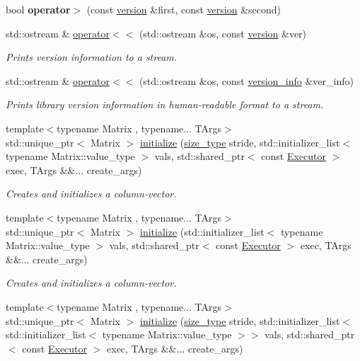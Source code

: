 \begin{DoxyCompactItemize}
bool {\bfseries operator$>$} (const \hyperlink{structgko_1_1version}{version} \&first, const \hyperlink{structgko_1_1version}{version} \&second)
\item 
std\+::ostream \& \hyperlink{namespacegko_ae0ef652f487afe43aebcf778038ff780}{operator$<$$<$} (std\+::ostream \&os, const \hyperlink{structgko_1_1version}{version} \&ver)
\begin{DoxyCompactList}\small\item\em Prints version information to a stream. \end{DoxyCompactList}\item 
std\+::ostream \& \hyperlink{namespacegko_ad9e3ba96a10fe47a03ceef39b45bd43c}{operator$<$$<$} (std\+::ostream \&os, const \hyperlink{classgko_1_1version__info}{version\+\_\+info} \&ver\+\_\+info)
\begin{DoxyCompactList}\small\item\em Prints library version information in human-\/readable format to a stream. \end{DoxyCompactList}\item 
{\footnotesize template$<$typename Matrix , typename... T\+Args$>$ }\\std\+::unique\+\_\+ptr$<$ Matrix $>$ \hyperlink{group__mat__formats_ga2f54bac1e95fb3ef03974fa9c9088491}{initialize} (\hyperlink{namespacegko_a6e5c95df0ae4e47aab2f604a22d98ee7}{size\+\_\+type} stride, std\+::initializer\+\_\+list$<$ typename Matrix\+::value\+\_\+type $>$ vals, std\+::shared\+\_\+ptr$<$ const \hyperlink{classgko_1_1Executor}{Executor} $>$ exec, T\+Args \&\&... create\+\_\+args)
\begin{DoxyCompactList}\small\item\em Creates and initializes a column-\/vector. \end{DoxyCompactList}\item 
{\footnotesize template$<$typename Matrix , typename... T\+Args$>$ }\\std\+::unique\+\_\+ptr$<$ Matrix $>$ \hyperlink{group__mat__formats_gaac5f7b4ff3b43dbc6918c687dd7d2d2e}{initialize} (std\+::initializer\+\_\+list$<$ typename Matrix\+::value\+\_\+type $>$ vals, std\+::shared\+\_\+ptr$<$ const \hyperlink{classgko_1_1Executor}{Executor} $>$ exec, T\+Args \&\&... create\+\_\+args)
\begin{DoxyCompactList}\small\item\em Creates and initializes a column-\/vector. \end{DoxyCompactList}\item 
{\footnotesize template$<$typename Matrix , typename... T\+Args$>$ }\\std\+::unique\+\_\+ptr$<$ Matrix $>$ \hyperlink{group__mat__formats_gaaf2520e5921e1bea00853c290f4fc28f}{initialize} (\hyperlink{namespacegko_a6e5c95df0ae4e47aab2f604a22d98ee7}{size\+\_\+type} stride, std\+::initializer\+\_\+list$<$ std\+::initializer\+\_\+list$<$ typename Matrix\+::value\+\_\+type $>$$>$ vals, std\+::shared\+\_\+ptr$<$ const \hyperlink{classgko_1_1Executor}{Executor} $>$ exec, T\+Args \&\&... create\+\_\+args)
$$
\end{DoxyCompactItemize}
